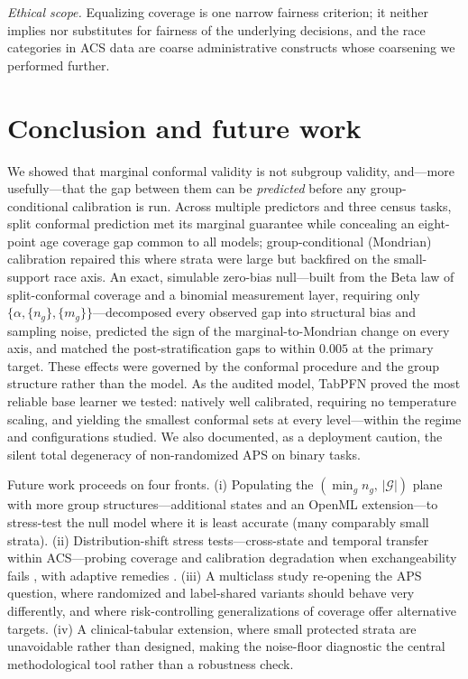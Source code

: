\documentclass[review,12pt]{elsarticle}
\begin{document}
\emph{Ethical scope.} Equalizing coverage is one narrow fairness criterion; it neither implies nor substitutes for fairness of the underlying decisions, and the race categories in ACS data are coarse administrative constructs whose coarsening we performed further.

\section{Conclusion and future work}
\label{sec:conclusion}

We showed that marginal conformal validity is not subgroup validity, and---more usefully---that the gap between them can be \emph{predicted} before any group-conditional calibration is run. Across multiple predictors and three census tasks, split conformal prediction met its marginal guarantee while concealing an eight-point age coverage gap common to all models; group-conditional (Mondrian) calibration repaired this where strata were large but backfired on the small-support race axis. An exact, simulable zero-bias null---built from the Beta law of split-conformal coverage and a binomial measurement layer, requiring only $\{\alpha, \{n_g\}, \{m_g\}\}$---decomposed every observed gap into structural bias and sampling noise, predicted the sign of the marginal-to-Mondrian change on every axis, and matched the post-stratification gaps to within $0.005$ at the primary target. These effects were governed by the conformal procedure and the group structure rather than the model. As the audited model, TabPFN proved the most reliable base learner we tested: natively well calibrated, requiring no temperature scaling, and yielding the smallest conformal sets at every level---within the regime and configurations studied. We also documented, as a deployment caution, the silent total degeneracy of non-randomized APS on binary tasks.

Future work proceeds on four fronts. (i) Populating the $(\min_g n_g,\,|\mathcal{G}|)$ plane with more group structures---additional states and an OpenML extension---to stress-test the null model where it is least accurate (many comparably small strata). (ii) Distribution-shift stress tests---cross-state and temporal transfer within ACS---probing coverage and calibration degradation when exchangeability fails \cite{ovadia2019}, with adaptive remedies \cite{gibbs2021,tibshirani2019}. (iii) A multiclass study re-opening the APS question, where randomized and label-shared variants \cite{romano2020aps,angelopoulos2021,ding2023} should behave very differently, and where risk-controlling generalizations of coverage \cite{bates2021} offer alternative targets. (iv) A clinical-tabular extension, where small protected strata are unavoidable rather than designed, making the noise-floor diagnostic the central methodological tool rather than a robustness check.
\end{document}
